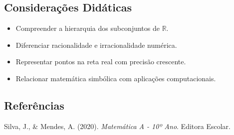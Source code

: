 \documentclass[
  letterpaper,
  DIV=11,
  numbers=noendperiod]{scrartcl}
\providecommand{\tightlist}{%
  \setlength{\itemsep}{0pt}\setlength{\parskip}{0pt}}\usepackage{longtable,booktabs,array}
\newlength{\cslhangindent}
\newenvironment{CSLReferences}[2] %
 {\begin{list}{}{%
  \setlength{\itemindent}{0pt}
  \setlength{\leftmargin}{0pt}
  \setlength{\parsep}{0pt}
  \ifodd #1
   \setlength{\leftmargin}{\cslhangindent}
   \setlength{\itemindent}{-1\cslhangindent}
  \fi
  \setlength{\itemsep}{#2\baselineskip}}}
 {\end{list}}
\begin{document}
\subsection{Considerações
Didáticas}\label{considerauxe7uxf5es-diduxe1ticas}

\begin{itemize}
\tightlist
\item
  Compreender a hierarquia dos subconjuntos de \(\mathbb{R}\).
\item
  Diferenciar racionalidade e irracionalidade numérica.
\item
  Representar pontos na reta real com precisão crescente.
\item
  Relacionar matemática simbólica com aplicações computacionais.
\end{itemize}

\subsection*{Referências}\label{referuxeancias}

\label{refs}
\begin{CSLReferences}{1}{0}
Silva, J., \& Mendes, A. (2020). \emph{Matemática A - 10º Ano}. Editora
Escolar.

\end{CSLReferences}
\end{document}
